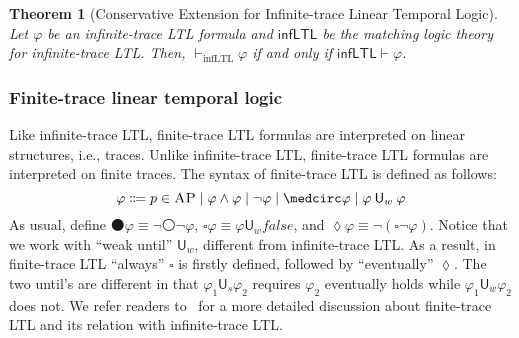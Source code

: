 \documentclass[letter,12pt]{article}
\newtheorem{theorem}{Theorem}
\newcommand{\MLinfLTL}{\mathsf{infLTL}}
\newcommand{\infLTL}{\mathrm{infLTL}}
\newcommand{\AP}{\textsc{AP}}
\newcommand{\false}{\mathit{false}}
\newcommand{\wnext}{{\medcirc}}
\newcommand{\snext}{{\medbullet}}
\newcommand{\always}{{\square}}
\newcommand{\eventually}{{\lozenge}}
\newcommand{\Us}{\mathbin{\mathsf{U}_s}}
\newcommand{\Uw}{\mathbin{\mathsf{U}_w}}
\begin{document}
\begin{theorem}[Conservative Extension for Infinite-trace Linear Temporal Logic]
Let $\varphi$ be an infinite-trace LTL formula and $\MLinfLTL$ be the matching
logic theory for infinite-trace LTL.
Then,
$\vdash_\infLTL \varphi$ if and only if
$\MLinfLTL \vdash \varphi$.
\label{thm_csrvext_infLTL}
\end{theorem}

\subsubsection{Finite-trace linear temporal logic}
Like infinite-trace LTL,
finite-trace LTL formulas are interpreted on linear structures, i.e., traces.
Unlike infinite-trace LTL, finite-trace LTL formulas
are interpreted on finite traces.
The syntax of finite-trace LTL is defined as follows:
$$
\varphi \Coloneqq
p \in \AP \mid
\varphi \wedge \varphi \mid
\neg \varphi \mid
\wnext \varphi \mid
\varphi \Uw \varphi
$$
As usual,
define $\snext \varphi \equiv \neg \wnext \neg \varphi$,
$\always \varphi \equiv \varphi \Uw \false$, and
$\eventually \varphi \equiv \neg (\always \neg \varphi)$.
Notice that we work with ``weak until'' $\Uw$, different from infinite-trace LTL.
As a result, in finite-trace LTL ``always'' $\always$ is firstly defined,
followed by ``eventually'' $\eventually$.
The two until's are different in that
$\varphi_1 \Us \varphi_2$ requires $\varphi_2$ eventually holds while
$\varphi_1 \Uw \varphi_2$ does not.
We refer readers to~\cite{bibid} for a more detailed discussion about
finite-trace LTL and its relation with infinite-trace LTL.
\end{document}
